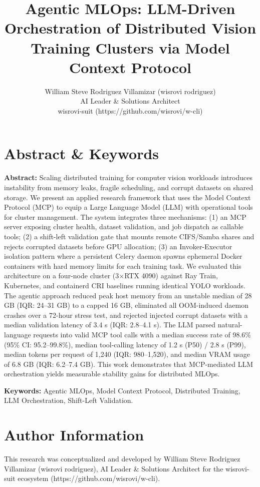 \documentclass[10pt,twocolumn,letterpaper]{article}
\title{Agentic MLOps: LLM-Driven Orchestration of Distributed Vision Training Clusters via Model Context Protocol}
\author{William Steve Rodriguez Villamizar (wisrovi rodriguez)\\AI Leader \& Solutions Architect\\wisrovi-suit (https://github.com/wisrovi/w-cli)}
\date{}
\begin{document}
\maketitle

\section{Abstract \& Keywords}
\textbf{Abstract:} Scaling distributed training for computer vision workloads introduces instability from memory leaks, fragile scheduling, and corrupt datasets on shared storage. We present an applied research framework that uses the Model Context Protocol (MCP) to equip a Large Language Model (LLM) with operational tools for cluster management. The system integrates three mechanisms: (1) an MCP server exposing cluster health, dataset validation, and job dispatch as callable tools; (2) a shift-left validation gate that mounts remote CIFS/Samba shares and rejects corrupted datasets before GPU allocation; (3) an Invoker-Executor isolation pattern where a persistent Celery daemon spawns ephemeral Docker containers with hard memory limits for each training task. We evaluated this architecture on a four-node cluster (3$\times$RTX 4090) against Ray Train, Kubernetes, and containerd CRI baselines running identical YOLO workloads. The agentic approach reduced peak host memory from an unstable median of 28 GB (IQR: 24--31 GB) to a capped 16 GB, eliminated all OOM-induced daemon crashes over a 72-hour stress test, and rejected injected corrupt datasets with a median validation latency of 3.4 s (IQR: 2.8--4.1 s). The LLM parsed natural-language requests into valid MCP tool calls with a median success rate of 98.6\% (95\% CI: 95.2--99.8\%), median tool-calling latency of 1.2 s (P50) / 2.8 s (P99), median tokens per request of 1,240 (IQR: 980--1,520), and median VRAM usage of 6.8 GB (IQR: 6.2--7.4 GB). This work demonstrates that MCP-mediated LLM orchestration yields measurable stability gains for distributed MLOps.

\textbf{Keywords:} Agentic MLOps, Model Context Protocol, Distributed Training, LLM Orchestration, Shift-Left Validation.

\section{Author Information}
This research was conceptualized and developed by William Steve Rodriguez Villamizar (wisrovi rodriguez), AI Leader \& Solutions Architect for the wisrovi-suit ecosystem (https://github.com/wisrovi/w-cli).
\end{document}
